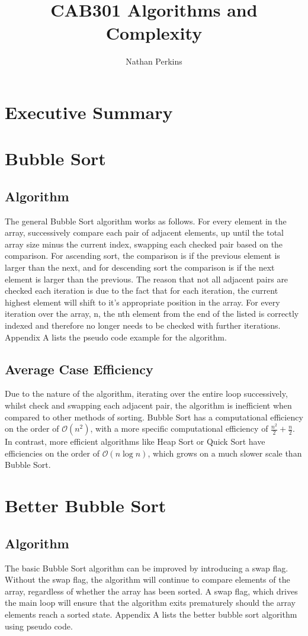 \documentclass[]{article}
\title{CAB301 Algorithms and Complexity}
\author{Nathan Perkins}
\begin{document}
\maketitle
\newpage
\tableofcontents
\newpage
\section{Executive Summary}
\section{Bubble Sort}
\subsection{Algorithm}
The general Bubble Sort algorithm works as follows. For every element in the array, successively compare each pair of adjacent elements, up until the total array size minus the current index, swapping each checked pair based on the comparison. For ascending sort, the comparison is if the previous element is larger than the next, and for descending sort the comparison is if the next element is larger than the previous. The reason that not all adjacent pairs are checked each iteration is due to the fact that for each iteration, the current highest element will shift to it's appropriate position in the array. For every iteration over the array, n, the nth element from the end of the listed is correctly indexed and therefore no longer needs to be checked with further iterations. Appendix A lists the pseudo code example for the algorithm.
\subsection{Average Case Efficiency}
Due to the nature of the algorithm, iterating over the entire loop successively, whilst check and swapping each adjacent pair, the algorithm is inefficient when compared to other methods of sorting. Bubble Sort has a computational efficiency on the order of $\mathcal{O}(n^2)$, with a more specific computational efficiency of $\frac{n^2}{2} + \frac{n}{2}$.
\cite{BubbleSort}
In contrast, more efficient algorithms like Heap Sort or Quick Sort have efficiencies on the order of $\mathcal{O}(n\log{}n)$,
which grows on a much slower scale than Bubble Sort.
\cite{HeapSort}
\section{Better Bubble Sort}
\subsection{Algorithm}
The basic Bubble Sort algorithm can be improved by introducing a swap flag. Without the swap flag, the algorithm will continue to compare elements of the array, regardless of whether the array has been sorted. A swap flag, which drives the main loop will ensure that the algorithm exits prematurely should the array elements reach a sorted state. Appendix A lists the better bubble sort algorithm using pseudo code.
\end{document}
